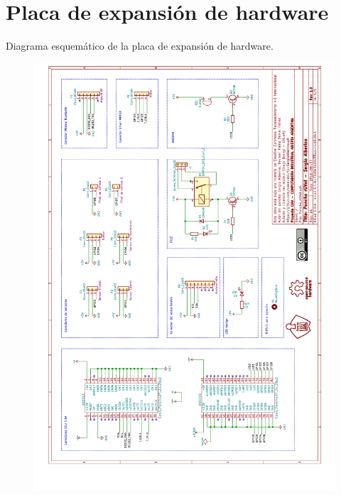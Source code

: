 
\chapter{Placa de expansión de hardware} %

\label{AppendixA} %

Diagrama esquemático de la placa de expansión de hardware.

\begin{figure}[h]
	\centering
	\includegraphics[width=12cm]{./Figures/esquematico.png}
\end{figure}
